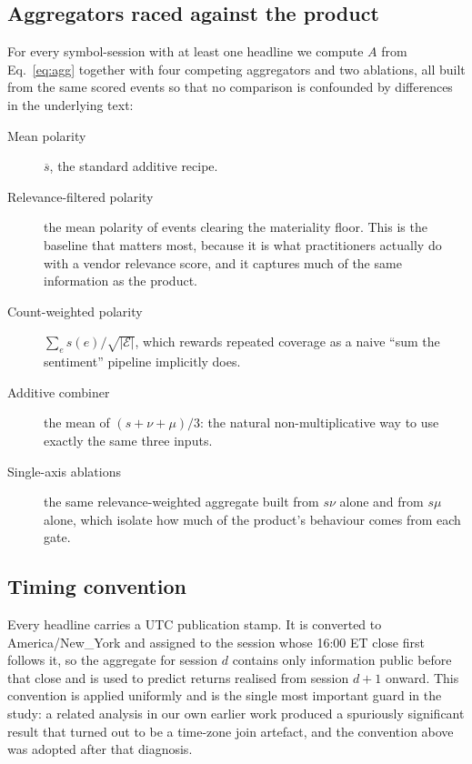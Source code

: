 \subsection{Aggregators raced against the product}\label{sec:baselines}

For every symbol-session with at least one headline we compute $A$ from
Eq.~\eqref{eq:agg} together with four competing aggregators and two ablations,
all built from the same scored events so that no comparison is confounded by
differences in the underlying text:

\begin{description}
\item[Mean polarity] $\overline{s}$, the standard additive recipe.
\item[Relevance-filtered polarity] the mean polarity of events clearing the
  materiality floor. This is the baseline that matters most, because it is what
  practitioners actually do with a vendor relevance score, and it captures much
  of the same information as the product.
\item[Count-weighted polarity] $\sum_e s(e)/\sqrt{|\mathcal{E}|}$, which rewards
  repeated coverage as a naive ``sum the sentiment'' pipeline implicitly does.
\item[Additive combiner] the mean of $(s+\nu+\mu)/3$: the natural
  non-multiplicative way to use exactly the same three inputs.
\item[Single-axis ablations] the same relevance-weighted aggregate built from
  $s\nu$ alone and from $s\mu$ alone, which isolate how much of the product's
  behaviour comes from each gate.
\end{description}

\subsection{Timing convention}\label{sec:timing}

Every headline carries a UTC publication stamp. It is converted to
America/New\_York and assigned to the session whose 16:00 ET close first follows
it, so the aggregate for session $d$ contains only information public before that
close and is used to predict returns realised from session $d+1$ onward. This
convention is applied uniformly and is the single most important guard in the
study: a related analysis in our own earlier work produced a spuriously
significant result that turned out to be a time-zone join artefact, and the
convention above was adopted after that diagnosis.

